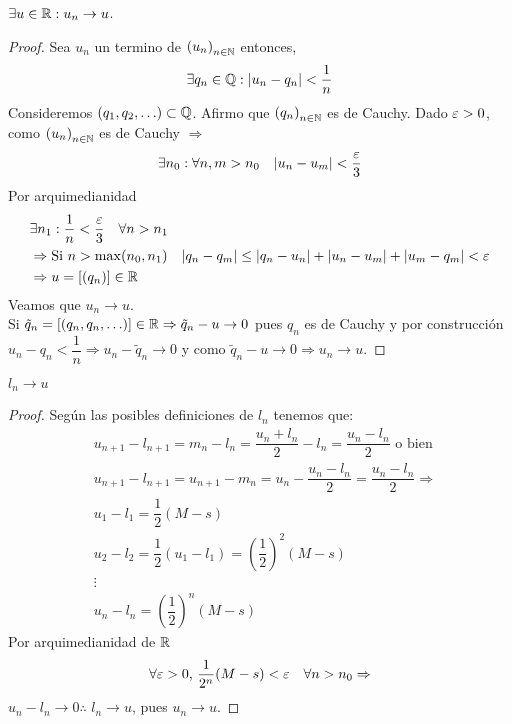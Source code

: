 \begin{lemma}
	\(\exists u \in \mathbb{R} : u_n \to u\).
	\begin{proof}
		Sea \(u_n\) un termino de \({(u_n)}_{n \in \mathbb{N}} \) entonces,\begin{align*}
			\exists q_n \in \mathbb{Q} : |u_n - q_n| < \dfrac{1}{n}
		\end{align*}
		Consideremos \((q_1, q_2, \ldots) \subset \mathbb{Q} \). Afirmo que \({(q_n)}_{n \in \mathbb{N}} \) es de Cauchy. Dado \(\varepsilon > 0\), como \({(u_n)}_{n \in \mathbb{N}} \) es de Cauchy \(\Rightarrow \)\begin{align*}
			\exists n_0 : \forall n, m > n_0 \quad |u_n - u_m| < \dfrac{\varepsilon}{3}
		\end{align*}
		Por arquimedianidad\begin{align*}
			 & \exists n_1 : \dfrac{1}{n} < \dfrac{\varepsilon}{3} \quad \forall n > n_1                                              \\
			 & \Rightarrow \text{Si } n > \max(n_0, n_1) \quad |q_n - q_m| \leq |q_n - u_n| + |u_n - u_m| + |u_m - q_m| < \varepsilon \\
			 & \Rightarrow u = [(q_n)] \in \mathbb{R}
		\end{align*}
		Veamos que \(u_n \to u\). \\
		Si \(\tilde{q}_n = [(q_n, q_n, \ldots)] \in \mathbb{R} \Rightarrow \tilde{q}_n - u \to 0\) pues \(q_n\) es de Cauchy y por construcción \(u_n - q_n < \dfrac{1}{n} \Rightarrow u_n - \tilde{q}_n \to 0\) y como \(\tilde{q}_n - u \to 0 \Rightarrow u_n \to u\).
	\end{proof}
\end{lemma}

\begin{lemma}
	\(l_n \to u\)
	\begin{proof}
		Según las posibles definiciones de \(l_n\) tenemos que: \begin{align*}
			 & u_{n+1} - l_{n+1} = m_n - l_n = \dfrac{u_n+l_n}{2} - l_n = \dfrac{u_n-l_n}{2} \text{ o bien }     \\
			 & u_{n+1} - l_{n+1} = u_{n+1} - m_n = u_n - \dfrac{u_n - l_n}{2} = \dfrac{u_n - l_n}{2} \Rightarrow \\
			 & u_1 - l_1 = \dfrac{1}{2} (M-s)                                                                    \\
			 & u_2 - l_2 = \dfrac{1}{2} (u_1 - l_1) = {\left(\dfrac{1}{2}\right)}^2 (M - s)                        \\
			 & \vdots                                                                                            \\
			 & u_n - l_n = {\left(\dfrac{1}{2}\right)}^n (M - s)
		\end{align*}
		Por arquimedianidad de \(\mathbb{R} \) \begin{align*}
			\forall \varepsilon > 0\text{, } \dfrac{1}{2^n} (M - s) < \varepsilon \quad \forall n > n_0 \Rightarrow
		\end{align*}
		\(u_n - l_n \to 0 \therefore \) \(l_n \to u\), pues \(u_n \to u\).
	\end{proof}
\end{lemma}

